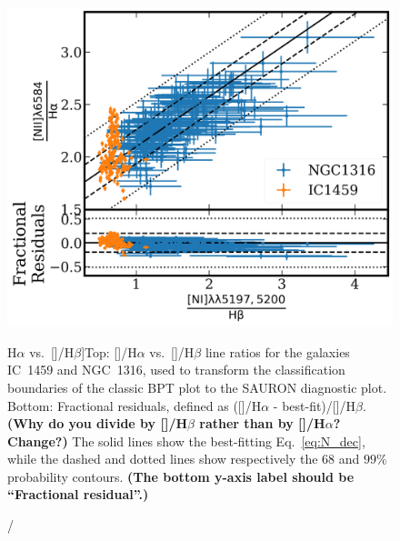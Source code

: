 \documentclass[a4paper,fleqn,usenatbib]{mnras}
\newcommand{\bracket}[1]{[#1]} %
\begin{document}
\begin{figure}
  \includegraphics[width=\columnwidth]{ratio_fit.png}
  \caption[\bracket{}/H$\alpha$ vs.\
  \bracket{}/H$\beta$]{Top: []/H$\alpha$ vs.\
    []/H$\beta$ line ratios for the galaxies IC~1459 and
    NGC~1316, used to transform the classification boundaries of the
    classic BPT plot to the SAURON diagnostic plot. Bottom: Fractional
    residuals, defined as ([\ion{N}{ii}]/H$\alpha$ -
    best-fit)/[]/H$\beta$. {\bf (Why do you divide by
      [\ion{N}{i}]/H$\beta$ rather than by []/H$\alpha$?
      Change?)}  The solid lines show the best-fitting
    Eq.~\ref{eq:N_dec}, while the dashed and dotted lines show
    respectively the $68$ and $99\%$ probability contours. {\bf (The
      bottom y-axis label should be ``Fractional residual''.)}}
  \label{fig:ratio_relation}
\end{figure}
\end{document}
